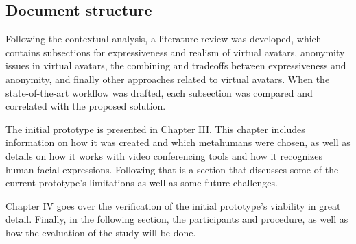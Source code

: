 \subsection{Document structure}
Following the contextual analysis, a literature review was developed, which contains subsections for expressiveness and realism of virtual avatars, anonymity issues in virtual avatars, the combining and tradeoffs between expressiveness and anonymity, and finally other approaches related to virtual avatars. When the state-of-the-art workflow was drafted, each subsection was compared and correlated with the proposed solution.

The initial prototype is presented in Chapter III. This chapter includes information on how it was created and which metahumans were chosen, as well as details on how it works with video conferencing tools and how it recognizes human facial expressions. Following that is a section that discusses some of the current prototype's limitations as well as some future challenges.

Chapter IV goes over the verification of the initial prototype's viability in great detail. Finally, in the following section, the participants and procedure, as well as how the evaluation of the study will be done.